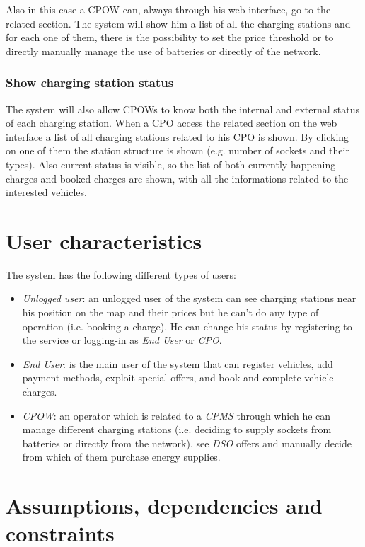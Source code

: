 \documentclass[a4paper]{report}
\begin{document}
Also in this case a CPOW can, always through his web interface, go to the related section. The system will show him a list of all the charging stations and for each one of them, there is the possibility to set the price threshold or to directly manually manage the use of batteries or directly of the network.
\subsubsection{Show charging station status}
The system will also allow CPOWs to know both the internal and external status of each charging station. When a CPO access the related section on the web interface a list of all charging stations related to his CPO is shown. By clicking on one of them the station structure is shown (e.g. number of sockets and their types). Also current status is visible, so the list of both currently happening charges and booked charges are shown, with all the informations related to the interested vehicles.


\section{User characteristics}
The system has the following different types of users:
\begin{itemize}
\item \textit{Unlogged user}: an unlogged user of the system can see charging stations near his position on the map and their prices but he can't do any type of operation (i.e. booking a charge). He can change his status by registering to the service or logging-in as \textit{End User} or \textit{CPO}.
\item \textit{End User}: is the main user of the system that can register vehicles, add payment methods, exploit special offers, and book and complete vehicle charges.
\item \textit{CPOW}: an operator which is related to a \textit{CPMS} through which he can manage different charging stations (i.e. deciding to supply sockets from batteries or directly from the network), see \textit{DSO} offers and manually decide from which of them purchase energy supplies.

\end{itemize}


\section{Assumptions, dependencies and constraints}
\end{document}
